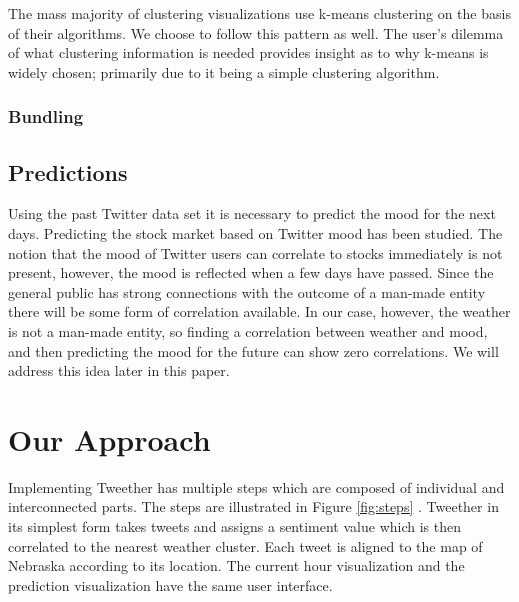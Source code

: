 \documentclass[journal]{vgtc}                %
\begin{document}
The mass majority of clustering visualizations use k-means clustering on the basis of their algorithms. \cite{li2014nasty,weber2001visualizing} We choose to follow this pattern as well. The user's dilemma of what clustering information is needed provides insight as to why k-means is widely chosen; primarily due to it being a simple clustering algorithm. \cite{weber2001visualizing}

\subsubsection{Bundling}

\newpage

\subsection{Predictions}

Using the past Twitter data set it is necessary to predict the mood for the next days. Predicting the stock market based on Twitter mood has been studied. \cite{woodring2009multiscale} The notion that the mood of Twitter users can correlate to stocks immediately is not present, however, the mood is reflected when a few days have passed. Since the general public has strong connections with the outcome of a man-made entity there will be some form of correlation available. In our case, however, the weather is not a man-made entity, so finding a correlation between weather and mood, and then predicting the mood for the future can show zero correlations. We will address this idea later in this paper.




\section{Our Approach}

Implementing Tweether has multiple steps which are composed of individual and interconnected parts. The steps are illustrated in Figure \ref{fig:steps} . Tweether in its simplest form takes tweets and assigns a sentiment value which is then correlated to the nearest weather cluster. Each tweet is aligned to the map of Nebraska according to its location. The current hour visualization and the prediction visualization have the same user interface.
\end{document}
